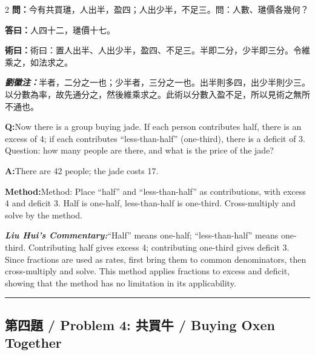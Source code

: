 \documentclass[11pt,a4paper]{article}
\newcommand{\cnwen}{\textcolor{cnlabelfg}{\textbf{問：}}}
\newcommand{\cnda}{\textbf{答曰：}}
\newcommand{\cnshu}{\textcolor{cnlabelfg}{\textbf{術曰：}}}
\newcommand{\cnzhu}{\textcolor{commentarycolor}{\textit{\textbf{劉徽注：}}}}
\newcommand{\enwen}{\textcolor{enlabelfg}{\textbf{Q:}}}
\newcommand{\enda}{\textcolor{enlabelfg}{\textbf{A:}}}
\newcommand{\enshu}{\textcolor{enlabelfg}{\textbf{Method:}}}
\newcommand{\enzhu}{\textcolor{enlabelfg}{\textit{\textbf{Liu Hui's Commentary:}}}}
\begin{document}
\begin{paracol}{2}
\switchcolumn[0]
\cnwen 今有共買璡，人出半，盈四；人出少半，不足三。問：人數、璡價各幾何？

\cnda 人四十二，璡價十七。

\cnshu 術曰：置人出半、人出少半，盈四、不足三。半即二分，少半即三分。令維乘之，如法求之。

\cnzhu 半者，二分之一也；少半者，三分之一也。出半則多四，出少半則少三。以分數為率，故先通分之，然後維乘求之。此術以分數入盈不足，所以見術之無所不通也。

\switchcolumn[1]
\enwen Now there is a group buying jade. If each person contributes half, there is an excess of 4; if each contributes ``less-than-half'' (one-third), there is a deficit of 3. Question: how many people are there, and what is the price of the jade?

\enda There are 42 people; the jade costs 17.

\enshu Method: Place ``half'' and ``less-than-half'' as contributions, with excess 4 and deficit 3. Half is one-half, less-than-half is one-third. Cross-multiply and solve by the method.

\enzhu ``Half'' means one-half; ``less-than-half'' means one-third. Contributing half gives excess 4; contributing one-third gives deficit 3. Since fractions are used as rates, first bring them to common denominators, then cross-multiply and solve. This method applies fractions to excess and deficit, showing that the method has no limitation in its applicability.
\end{paracol}

\bigskip\hrule\bigskip

\subsection{第四題 / Problem 4: 共買牛 / Buying Oxen Together}
\end{document}
